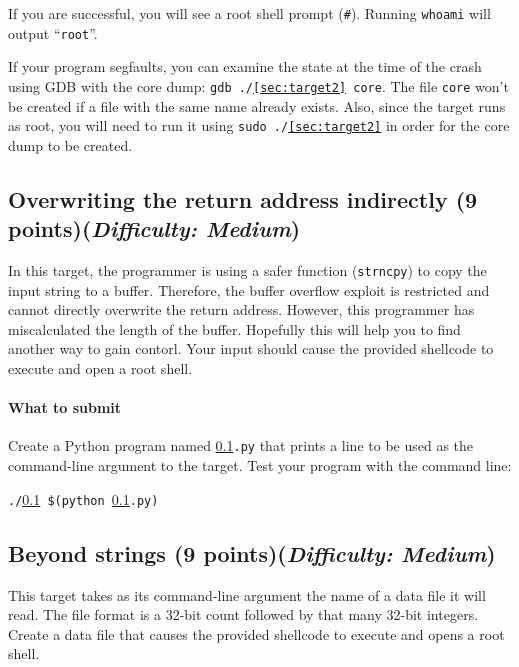 \documentclass[letterpaper,12pt]{report}
\begin{document}
{\medskip

If you are successful, you will see a root shell prompt (\texttt{\#}).  Running \texttt{whoami} will output ``\texttt{root}''.

\medskip

If your program segfaults, you can examine the state at the time of the crash using GDB with the core dump: \texttt{gdb ./\ref{sec:target2} core}.  The file \texttt{core} won't be created if a file with the same name already exists.  Also, since the target runs as root, you will need to run it using \texttt{sudo ./\ref{sec:target2}} in order for the core dump to be created.

\subsection{Overwriting the return address indirectly (9 points)\hfill\rm\normalsize (\emph{Difficulty: Medium})}
\label{sec:target3}

In this target, the programmer is using a safer function (\texttt{strncpy}) to copy the input string to a buffer. Therefore, the buffer overflow exploit is restricted and cannot directly overwrite the return address.   However, this programmer has miscalculated the length of the buffer. Hopefully this will help you to find another way to gain contorl.  Your input should cause the provided shellcode to execute and open a root shell.

\paragraph{What to submit}
Create a Python program named \texttt{\ref{sec:target3}.py} that prints a line to be used as the command-line argument to the target.  Test your program with the command line:

\smallskip

\quad\texttt{./\ref{sec:target3} \$(python \ref{sec:target3}.py)}

\subsection{Beyond strings (9 points)\hfill\rm\normalsize (\emph{Difficulty: Medium})}
\label{sec:target4}

This target takes as its command-line argument the name of a data file it will read.  The file format is a 32-bit count followed by that many 32-bit integers.  Create a data file that causes the provided shellcode to execute and opens a root shell.

}
\end{document}
